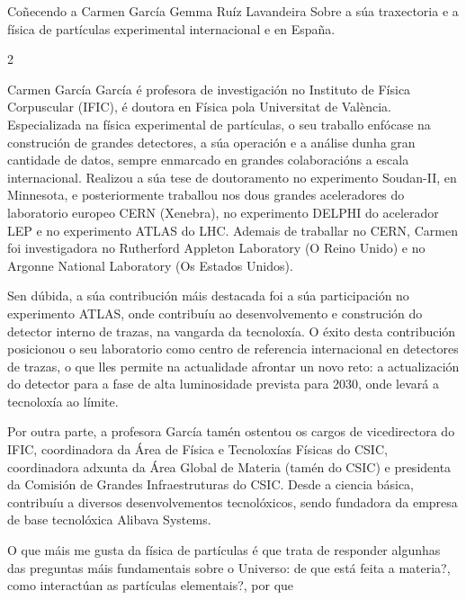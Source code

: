 \Artigo*%
{entrevistas}%
{Coñecendo a Carmen García}%
{Gemma Ruíz Lavandeira}%
{Sobre a súa traxectoria e a física de partículas experimental internacional e en España.}

\begin{multicols}{2}

Carmen García García é profesora de investigación no Instituto de Física
Corpuscular (IFIC), é doutora en Física pola Universitat de València. Especializada na
física experimental de partículas, o seu traballo enfócase na construción de
grandes detectores, a súa operación e a análise dunha gran cantidade de datos,
sempre enmarcado en grandes colaboracións a escala internacional. Realizou a
súa tese de doutoramento no experimento Soudan-II, en Minnesota, e posteriormente
traballou nos dous grandes aceleradores do laboratorio europeo CERN (Xenebra), no
experimento DELPHI do acelerador LEP e no experimento ATLAS do LHC. Ademais de
traballar no CERN, Carmen foi investigadora no Rutherford Appleton Laboratory
(O Reino Unido) e no Argonne National Laboratory (Os Estados Unidos).

Sen dúbida, a súa contribución máis destacada foi a súa participación no
experimento ATLAS, onde contribuíu ao desenvolvemento e construción do detector
interno de trazas, na vangarda da tecnoloxía. O éxito desta contribución
posicionou o seu laboratorio como centro de referencia internacional en
detectores de trazas, o que lles permite na actualidade afrontar un novo reto:
a actualización do detector para a fase de alta luminosidade prevista para
2030, onde levará a tecnoloxía ao límite.

Por outra parte, a profesora García tamén ostentou os cargos de vicedirectora
do IFIC, coordinadora da Área de Física e Tecnoloxías Físicas do CSIC,
coordinadora adxunta da Área Global de Materia (tamén do CSIC) e presidenta da
Comisión de Grandes Infraestruturas do CSIC. Desde a ciencia básica, contribuíu
a diversos desenvolvementos tecnolóxicos, sendo fundadora da empresa de base
tecnolóxica Alibava Systems.

\textcolor{Resalte}{\hrulefill}


O que máis me gusta da física de partículas é que trata de responder algunhas
das preguntas máis fundamentais sobre o Universo: de que está feita a materia?,
como interactúan as partículas elementais?, por que


\end{multicols}
